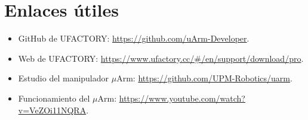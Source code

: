 \chapter{Enlaces útiles}
\begin{itemize}
    \item GitHub de UFACTORY: \url{https://github.com/uArm-Developer}.
    \item Web de UFACTORY: \url{https://www.ufactory.cc/\#/en/support/download/pro}.
    \item Estudio del manipulador $\mu$Arm: \url{https://github.com/UPM-Robotics/uarm}.
    \item Funcionamiento del $\mu$Arm: \url{https://www.youtube.com/watch?v=VeZOi11NQRA}.
\end{itemize}